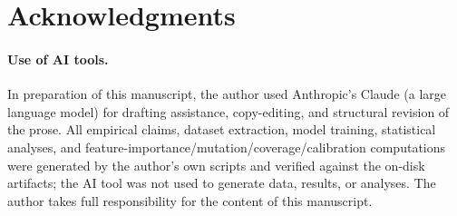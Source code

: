 \documentclass[10pt,twocolumn,letterpaper]{article}
\begin{document}
\section*{Acknowledgments}
\paragraph{Use of AI tools.} In preparation of this manuscript, the
author used Anthropic's Claude (a large language model) for drafting
assistance, copy-editing, and structural revision of the prose. All
empirical claims, dataset extraction, model training, statistical
analyses, and feature-importance/mutation/coverage/calibration computations
were generated by the author's own scripts and verified against the
on-disk artifacts; the AI tool was not used to generate data, results,
or analyses. The author takes full responsibility for the content of
this manuscript.



\end{document}
